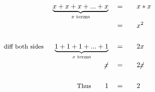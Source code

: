 \begin{alignat*}{5}
&\,&\underbrace{x+x+x+...+x}_{x\text{ terms}}\quad&=\quad&&x*x\\
&\,&\,&=&&x^2\\ \\
&\small\text{diff both sides }&\underbrace{1+1+1+...+1}_{x\text{ terms}}\quad&=&&2x\\
&\,&\cancel{x}\quad&=&&2\cancel{x}\\ \\
&\,&\small\text{Thus}\normalsize\qquad1\quad&=&&2
\end{alignat*}
